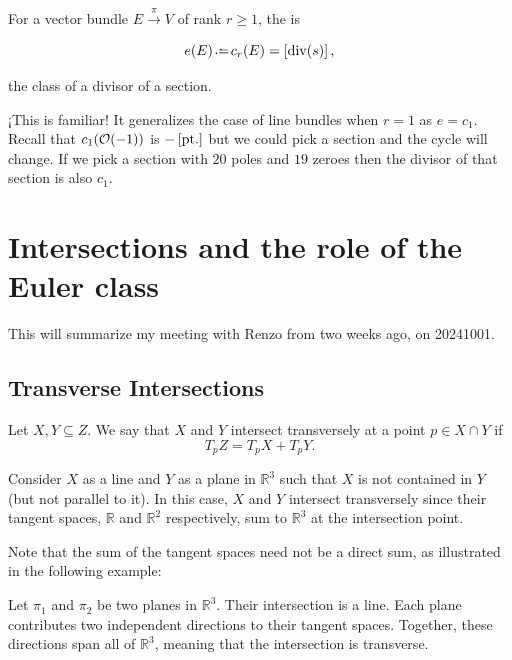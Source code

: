 \documentclass[12pt]{memoir}
\begin{document}
\begin{Def}
    For a vector bundle \(E\xrightarrow{\pi}V\) of rank \(r\geq 1\), the  is

    \[e(E)\defeq c_r(E)=\bonj{\div(s)},\]

    the class of a divisor of a section.
\end{Def}

\begin{Rmk}
    ¡This is familiar! It generalizes the case of line bundles when \(r=1\) as \(e=c_1\). Recall that \(c_1(\mathcal{O}(-1))\) is \(-\left\lbrack\text{pt}.\right\rbrack\) but we could pick a section and the cycle will change. If we pick a section with \(20\) poles and \(19\) zeroes then the divisor of that section is also \(c_1\).
\end{Rmk}

\section{Intersections and the role of the Euler class}

This will summarize my meeting with Renzo from two weeks ago, on 20241001.

\subsection{Transverse Intersections}

\begin{Def}
    Let \(X, Y \subseteq Z\). We say that \(X\) and \(Y\) intersect transversely at a point \(p \in X \cap Y\) if
    \[    T_p Z = T_p X + T_p Y.
    \]
\end{Def}

\begin{Ex}
    Consider \(X\) as a line and \(Y\) as a plane in \(\mathbb{R}^3\) such that \(X\) is not contained in \(Y\) (but not parallel to it). In this case, \(X\) and \(Y\) intersect transversely since their tangent spaces, \(\mathbb{R}\) and \(\mathbb{R}^2\) respectively, sum to \(\mathbb{R}^3\) at the intersection point.
\end{Ex}

Note that the sum of the tangent spaces need not be a direct sum, as illustrated in the following example:

\begin{Ex}
    Let \(\pi_1\) and \(\pi_2\) be two planes in \(\mathbb{R}^3\). Their intersection is a line. Each plane contributes two independent directions to their tangent spaces. Together, these directions span all of \(\mathbb{R}^3\), meaning that the intersection is transverse.
\end{Ex}
\end{document}
